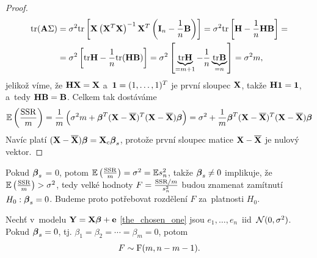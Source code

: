 \begin{proof}
\begin{align*}
\mathrm{tr} (\textbf{A} \Sigma) & = \sigma^2 \mathrm{tr} \left[\mathbf{X} \left(\mathbf{X}^T \mathbf{X} \right)^{-1} \mathbf{X}^T \left(\textbf{I}_{n} - \frac{1}{n} \textbf{B} \right) \right] = \sigma^2 \mathrm{tr}\left[\textbf{H} - \frac{1}{n} \textbf{H} \textbf{B} \right] = \\
& = \sigma^2 \left[\mathrm{tr} \textbf{H} - \frac{1}{n} \mathrm{tr} (\textbf{H} \textbf{B}) \right] = \sigma^2 \left[\underbrace{\mathrm{tr} \textbf{H}}_{ = m+1} - \frac{1}{n} \underbrace{\mathrm{tr} \textbf{B}}_{ = n} \right] = \sigma^2 m,
\end{align*}
jelikož víme, že $\textbf{H} \mathbf{X} = \mathbf{X}$ a~$\mathbf{1} = (1,\dots, 1)^T$ je první sloupec $\mathbf{X}$, takže $\textbf{H} \mathbf{1} = \mathbf{1}$, a~tedy $\textbf{H} \textbf{B} = \textbf{B}$. Celkem tak dostáváme
 $$
\mathbb{E} \left(\frac{\mathrm{SSR}}{m} \right) = \frac{1}{m} \left(\sigma^2 m + \boldsymbol{\beta}^T (\mathbf{X} - \overline{\mathbf{X}})^T(\mathbf{X} - \overline{\mathbf{X}}) \boldsymbol{\beta} \right) = \sigma^2 + \frac{1}{m} \boldsymbol{\beta}^T (\mathbf{X} - \overline{\mathbf{X}})^T(\mathbf{X} - \overline{\mathbf{X}}) \boldsymbol{\beta}
 $$
Navíc platí $(\mathbf{X} - \overline{\mathbf{X}}) \boldsymbol{\beta} = \mathbf{X}_c \boldsymbol{\beta}_s$, protože první sloupec matice $\mathbf{X} - \overline{\mathbf{X}}$ je nulový vektor.
\end{proof}

\begin{remark}
Pokud $\boldsymbol{\beta}_s$ = 0, potom $\mathbb{E} \left(\frac{\mathrm{SSR}}{m} \right) = \sigma^2 = \mathbb{E} s_n^2$, takže $\boldsymbol{\beta}_s \neq 0$ implikuje, že $\mathbb{E} \left(\frac{\mathrm{SSR}}{m} \right) > \sigma^2$, tedy velké hodnoty $F = \frac{\mathrm{SSR}/m}{s_n^2}$ budou znamenat zamítnutí $H_0: \boldsymbol{\beta}_s = 0$. Budeme proto potřebovat rozdělení $F$ za~platnosti $H_0$.
\end{remark}

\begin{theorem}
Nechť v~modelu $\mathbf{Y} = \mathbf{X} \boldsymbol{\beta} + \mathbf{e}$ \eqref{the_chosen_one} jsou $e_1,\dots, e_n $~iid~$\mathcal{N}(0,\sigma^2)$. Pokud $\boldsymbol{\beta}_s = 0$, tj. $\beta_1 = \beta_2 = \cdots = \beta_m = 0$, potom
 $$
F \sim \mathrm{F}(m, n - m -1).
 $$
\end{theorem}

